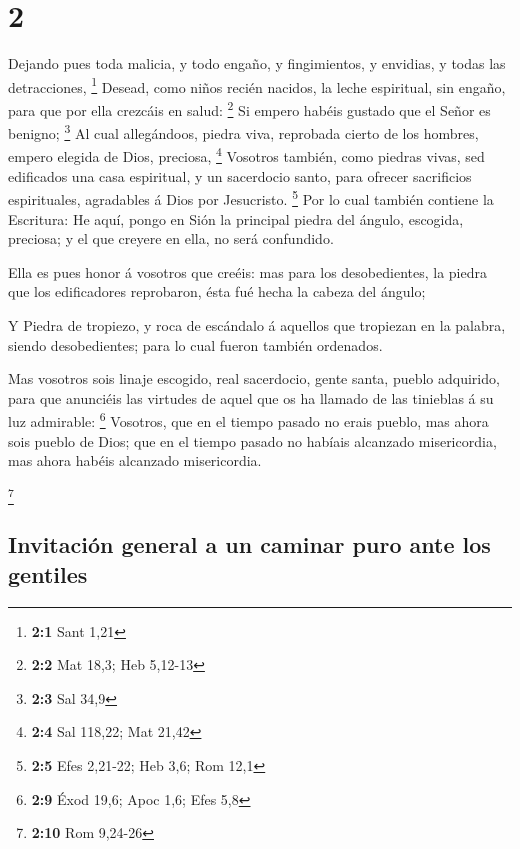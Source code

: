 \hypertarget{section-1}{%
\section{2}\label{section-1}}

 Dejando pues toda malicia, y todo engaño, y fingimientos,
y envidias, y todas las detracciones, \footnote{\textbf{2:1} Sant 1,21}
 Desead, como niños recién nacidos, la leche espiritual,
sin engaño, para que por ella crezcáis en salud: \footnote{\textbf{2:2}
  Mat 18,3; Heb 5,12-13}  Si empero habéis gustado que el
Señor es benigno; \footnote{\textbf{2:3} Sal 34,9}  Al
cual allegándoos, piedra viva, reprobada cierto de los hombres, empero
elegida de Dios, preciosa, \footnote{\textbf{2:4} Sal 118,22; Mat 21,42}
 Vosotros también, como piedras vivas, sed edificados una
casa espiritual, y un sacerdocio santo, para ofrecer sacrificios
espirituales, agradables á Dios por Jesucristo. \footnote{\textbf{2:5}
  Efes 2,21-22; Heb 3,6; Rom 12,1}  Por lo cual también
contiene la Escritura: He aquí, pongo en Sión la principal piedra del
ángulo, escogida, preciosa; y el que creyere en ella, no será
confundido.

 Ella es pues honor á vosotros que creéis: mas para los
desobedientes, la piedra que los edificadores reprobaron, ésta fué hecha
la cabeza del ángulo;

 Y Piedra de tropiezo, y roca de escándalo á aquellos que
tropiezan en la palabra, siendo desobedientes; para lo cual fueron
también ordenados.

 Mas vosotros sois linaje escogido, real sacerdocio, gente
santa, pueblo adquirido, para que anunciéis las virtudes de aquel que os
ha llamado de las tinieblas á su luz admirable: \footnote{\textbf{2:9}
  Éxod 19,6; Apoc 1,6; Efes 5,8}  Vosotros, que en el
tiempo pasado no erais pueblo, mas ahora sois pueblo de Dios; que en el
tiempo pasado no habíais alcanzado misericordia, mas ahora habéis
alcanzado misericordia.

\footnote{\textbf{2:10} Rom 9,24-26}

\hypertarget{invitaciuxf3n-general-a-un-caminar-puro-ante-los-gentiles}{%
\subsection{Invitación general a un caminar puro ante los
gentiles}\label{invitaciuxf3n-general-a-un-caminar-puro-ante-los-gentiles}}


